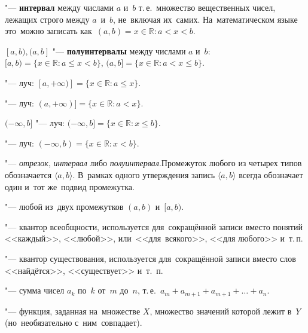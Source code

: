 \documentclass[]{scrartcl}
\begin{document}
\begin{description}
	\item[$(a, b)$] "--- \textbf{интервал} между числами $a$ и~$b$ т.\,е.~множество вещественных чисел, лежащих строго между $a$~и~$b$, не~включая их~самих. На~математическом языке это~можно записать как~$(a, b) = {x \in \mathbb{R}: a < x < b }$.
	\item$[a, b), (a, b]$ "--- \textbf{полуинтервалы} между числами $a$ и~$b$: $[a,b) = \{x \in \mathbb{R}: a \leq x < b\}$, $(a,b] = \{x \in \mathbb{R}: a < x \leq b\}$.
	\item[$[a, +\infty)$] "--- луч: $[a, +\infty)] = \{x \in \mathbb{R}: a \leq x\}$.
	\item[($a, +\infty$)] "--- луч: $(a, +\infty)] = \{x \in \mathbb{R}: a < x\}$.
	\item$(-\infty, b]$ "--- луч: $(- \infty, b] = \{x \in \mathbb{R}: x \leq b\}$.
	\item[$(-\infty, b)$] "--- луч: $(-\infty, b) = \{x \in \mathbb{R}: x < b\}$.
	\item[Промежуток] "--- \emph{отрезок}, \emph{интервал} либо \emph{полуинтервал}.Промежуток любого из четырех типов обозначается $\langle a, b \rangle$. В~рамках одного утверждения запись $\langle a, b \rangle$ всегда обозначает один и~тот же~подвид промежутка.
	\item[$\langle a, b \rangle$] "--- любой из~двух промежутков  $(a,b)$ и~$[a,b)$.
	\item[$\forall$] "--- квантор всеобщности, используется для~сокращённой записи вместо понятий <<каждый>>, <<любой>>, или~<<для~всякого>>, <<для любого>> и~т.\,п.
	\item[$\exists$] "--- квантор существования, используется для~сокращённой записи вместо слов <<найдётся>>, <<существует>> и~т.~п.
	\item[$\sum \limits_{k=n}^{n} a_k$] "--- сумма чисел $a_k$ по~$k$ от~$m$ до~$n$, т.\,е.~$a_m + a_{m+1}+a_{m+1}+\ldots+a_n$.
	\item[$f:X \textrightarrow Y$] "--- функция, заданная на~множестве $X$, множество значений которой лежит в~$Y$ (но~необязательно с~ним~совпадает).
	
	
	
\end{description}
\end{document}
